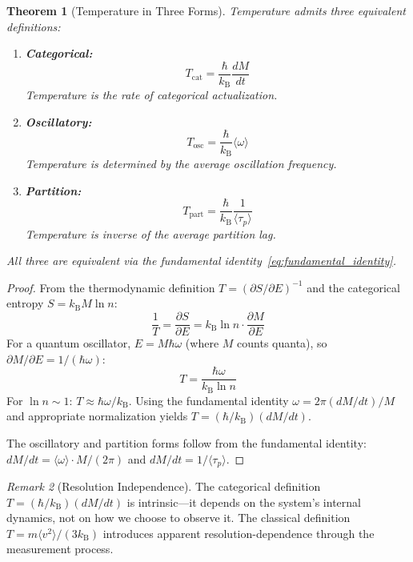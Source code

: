 \documentclass[twocolumn,10pt,a4paper]{article}
\theoremstyle{plain}
\newtheorem{theorem}{Theorem}[section]
\theoremstyle{definition}
\theoremstyle{remark}
\newtheorem{remark}[theorem]{Remark}
\newcommand{\kB}{k_{\mathrm{B}}}
\newcommand{\taup}{\tau_p}
\begin{document}
\begin{theorem}[Temperature in Three Forms]
\label{thm:temperature}
Temperature admits three equivalent definitions:
\begin{enumerate}
    \item \textbf{Categorical:}
    \begin{equation}
        T_{\mathrm{cat}} = \frac{\hbar}{\kB}\frac{dM}{dt}
    \end{equation}
    Temperature is the rate of categorical actualization.

    \item \textbf{Oscillatory:}
    \begin{equation}
        T_{\mathrm{osc}} = \frac{\hbar}{\kB}\langle\omega\rangle
    \end{equation}
    Temperature is determined by the average oscillation frequency.

    \item \textbf{Partition:}
    \begin{equation}
        T_{\mathrm{part}} = \frac{\hbar}{\kB}\frac{1}{\langle\taup\rangle}
    \end{equation}
    Temperature is inverse of the average partition lag.
\end{enumerate}
All three are equivalent via the fundamental identity~\eqref{eq:fundamental_identity}.
\end{theorem}

\begin{proof}
From the thermodynamic definition $T = (\partial S/\partial E)^{-1}$ and the categorical entropy $S = \kB M \ln n$:
\begin{equation}
    \frac{1}{T} = \frac{\partial S}{\partial E} = \kB \ln n \cdot \frac{\partial M}{\partial E}
\end{equation}
For a quantum oscillator, $E = M\hbar\omega$ (where $M$ counts quanta), so $\partial M/\partial E = 1/(\hbar\omega)$:
\begin{equation}
    T = \frac{\hbar\omega}{\kB \ln n}
\end{equation}
For $\ln n \sim 1$: $T \approx \hbar\omega/\kB$. Using the fundamental identity $\omega = 2\pi(dM/dt)/M$ and appropriate normalization yields $T = (\hbar/\kB)(dM/dt)$.

The oscillatory and partition forms follow from the fundamental identity: $dM/dt = \langle\omega\rangle \cdot M/(2\pi)$ and $dM/dt = 1/\langle\taup\rangle$.
\end{proof}

\begin{remark}[Resolution Independence]
The categorical definition $T = (\hbar/\kB)(dM/dt)$ is intrinsic---it depends on the system's internal dynamics, not on how we choose to observe it. The classical definition $T = m\langle v^2\rangle/(3\kB)$ introduces apparent resolution-dependence through the measurement process.
\end{remark}
\end{document}
